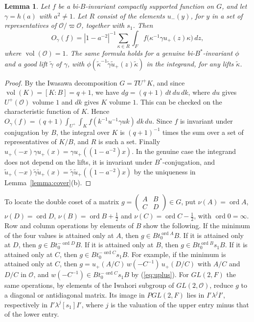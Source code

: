 \documentclass[12pt,letterpaper]{amsart}
\numberwithin{equation}{section}
\newtheorem{lemma}[theorem]{Lemma}
\theoremstyle{definition}
\theoremstyle{remark}
\DeclareMathOperator{\vol}{vol}
\DeclareMathOperator{\ord}{ord}
\newcommand{\cO}{\mathcal{O}}
\newcommand{\mat}[4]{\begin{pmatrix} #1 & #2\\ #3 & #4\end{pmatrix}}
\begin{document}
\begin{lemma}
\label{lemma:orbred}
Let $f$ be a bi-$B$-invariant compactly supported function on $G$, and
let $\gamma=h(a)$ with $a^2\neq1$. Let $R$ consist of the elements
$u_-(y)$, for $y$ in a set of representatives of $\cO/\varpi\cO$,
together with $s_1$. Then
\[
O_\gamma(f)=|1-a^{-2}|^{-1}\sum_{\kappa\in R}\int_F
f\bigl(\kappa^{-1}\gamma u_+(z)\kappa\bigr)\,dz,
\]
where $\vol(\cO)=1$. The same formula holds for a genuine
bi-$B^*$-invariant $\phi$ and a good lift $\tilde\gamma$ of $\gamma$,
with $\phi(\tilde\kappa^{-1}\tilde\gamma\tilde u_+(z)\tilde\kappa)$
in the integrand, for any lifts $\tilde\kappa$.
\end{lemma}

\begin{proof}
By the Iwasawa decomposition $G=TU^+K$, and since
$\vol(K)=[K:B]=q+1$, we have $dg=(q+1)\,dt\,du\,dk$, where $du$ gives
$U^+(\cO)$ volume $1$ and $dk$ gives $K$ volume $1$. This can be
checked on the characteristic function of $K$. Hence
$O_\gamma(f)=(q+1)\int_{U^+}\int_Kf(k^{-1}u^{-1}\gamma uk)\,dk\,du$.
Since $f$ is invariant under conjugation by $B$, the integral over $K$
is $(q+1)^{-1}$ times the sum over a set of representatives of $K/B$,
and $R$ is such a set. Finally
$u_+(-x)\gamma u_+(x)=\gamma u_+((1-a^{-2})x)$. In the genuine case
the integrand does not depend on the lifts, it is invariant under
$B^*$-conjugation, and
$\tilde u_+(-x)\tilde\gamma\tilde u_+(x)=\tilde\gamma\tilde
u_+((1-a^{-2})x)$ by the uniqueness in Lemma~\ref{lemma:cover}(b).
\end{proof}

To locate the double coset of a matrix $g=\mat ABCD\in G$, put
$\nu(A)=\ord A$, $\nu(D)=\ord D$, $\nu(B)=\ord B+\frac12$ and
$\nu(C)=\ord C-\frac12$, with $\ord 0=\infty$. Row and column
operations by elements of $B$ show the following. If the minimum of
the four values is attained only at $A$, then $g\in Bt_0^{\ord A}B$.
If it is attained only at $D$, then $g\in Bt_0^{-\ord D}B$. If it is
attained only at $B$, then $g\in Bt_0^{\ord B}s_1B$. If it is attained
only at $C$, then $g\in Bt_0^{-\ord C}s_1B$. For example, if the
minimum is attained only at $C$, then $g=u_+(A/C)\,w(-C^{-1})\,u_+(D/C)$
with $A/C$ and $D/C$ in $\cO$, and $w(-C^{-1})\in Bt_0^{-\ord
C}s_1B$ by (\ref{eq:uplus}). For $GL(2,F)$ the same operations, by
elements of the Iwahori subgroup of $GL(2,\cO)$, reduce $g$ to a
diagonal or antidiagonal matrix. Its image in $PGL(2,F)$ lies in
$I'\lambda^jI'$, respectively in $I'\lambda^j[s_1]I'$, where $j$ is
the valuation of the upper entry minus that of the lower entry.
\end{document}
